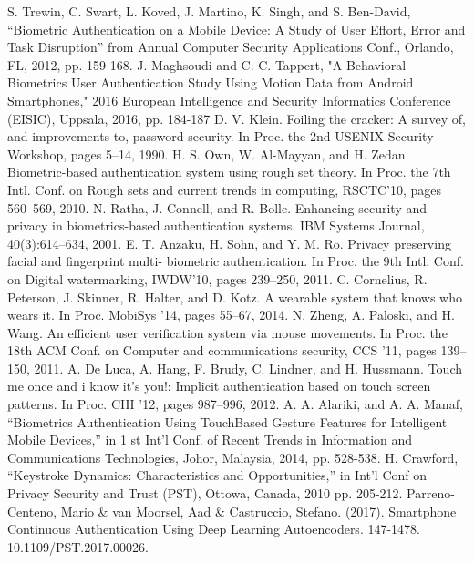 \documentclass[10pt,halfline,a4paper]{ouparticle}
\begin{document}
\begin{thebibliography}{999}
	S. Trewin, C. Swart, L. Koved, J. Martino, K. Singh, and S. Ben-David, “Biometric Authentication on a Mobile Device: A Study of User Effort, Error and Task Disruption” from Annual Computer Security Applications Conf., Orlando, FL, 2012, pp. 159-168.
	J. Maghsoudi and C. C. Tappert, "A Behavioral Biometrics User Authentication Study Using Motion Data from Android Smartphones," 2016 European Intelligence and Security Informatics Conference (EISIC), Uppsala, 2016, pp. 184-187
	D. V. Klein. Foiling the cracker: A survey of, and improvements to, password security. In Proc. the 2nd USENIX Security Workshop, pages 5–14, 1990.
	H. S. Own, W. Al-Mayyan, and H. Zedan. Biometric-based authentication system using rough set theory. In Proc. the 7th Intl. Conf. on Rough sets and current trends in computing, RSCTC’10, pages 560–569, 2010.
	N. Ratha, J. Connell, and R. Bolle. Enhancing security and privacy in biometrics-based authentication systems. IBM Systems Journal, 40(3):614–634, 2001.
	 E. T. Anzaku, H. Sohn, and Y. M. Ro. Privacy preserving facial and fingerprint multi- biometric authentication. In Proc. the 9th Intl. Conf. on Digital watermarking, IWDW’10, pages 239–250, 2011.
	C. Cornelius, R. Peterson, J. Skinner, R. Halter, and D. Kotz. A wearable system that knows who wears it. In Proc. MobiSys ’14, pages 55–67, 2014.
	 N. Zheng, A. Paloski, and H. Wang. An efficient user verification system via mouse movements. In Proc. the 18th ACM Conf. on Computer and communications security, CCS ’11, pages 139–150, 2011.
	A. De Luca, A. Hang, F. Brudy, C. Lindner, and H. Hussmann. Touch me once and i know it’s you!: Implicit authentication based on touch screen patterns. In Proc. CHI ’12, pages 987–996, 2012.
	 A. A. Alariki, and A. A. Manaf, “Biometrics Authentication Using TouchBased Gesture Features for Intelligent Mobile Devices,” in 1 st Int’l Conf. of Recent Trends in Information and Communications Technologies, Johor, Malaysia, 2014, pp. 528-538.
	H. Crawford, “Keystroke Dynamics: Characteristics and Opportunities,” in Int’l Conf on Privacy Security and Trust (PST), Ottowa, Canada, 2010 pp. 205-212.
	Parreno-Centeno, Mario \& van Moorsel, Aad \& Castruccio, Stefano. (2017). Smartphone Continuous Authentication Using Deep Learning Autoencoders. 147-1478. 10.1109/PST.2017.00026. 

\end{thebibliography}
\end{document}
